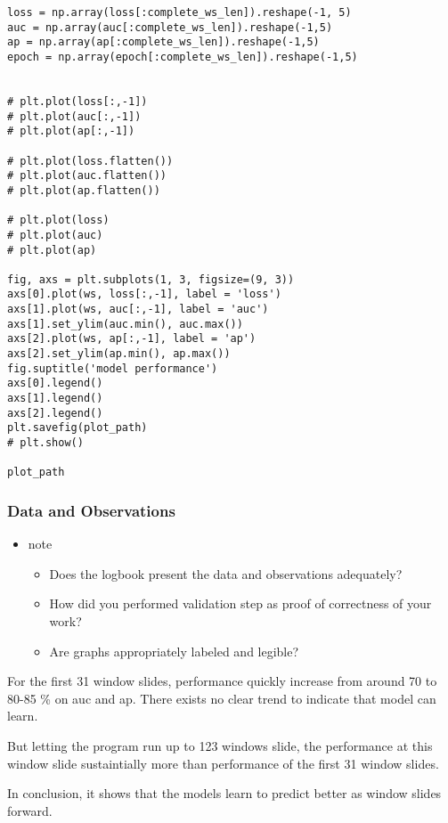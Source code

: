 \documentclass[11pt]{article}
\begin{document}
\begin{verbatim}
loss = np.array(loss[:complete_ws_len]).reshape(-1, 5)
auc = np.array(auc[:complete_ws_len]).reshape(-1,5)
ap = np.array(ap[:complete_ws_len]).reshape(-1,5)
epoch = np.array(epoch[:complete_ws_len]).reshape(-1,5)


# plt.plot(loss[:,-1])
# plt.plot(auc[:,-1])
# plt.plot(ap[:,-1])

# plt.plot(loss.flatten())
# plt.plot(auc.flatten())
# plt.plot(ap.flatten())

# plt.plot(loss)
# plt.plot(auc)
# plt.plot(ap)

fig, axs = plt.subplots(1, 3, figsize=(9, 3))
axs[0].plot(ws, loss[:,-1], label = 'loss')
axs[1].plot(ws, auc[:,-1], label = 'auc')
axs[1].set_ylim(auc.min(), auc.max())
axs[2].plot(ws, ap[:,-1], label = 'ap')
axs[2].set_ylim(ap.min(), ap.max())
fig.suptitle('model performance')
axs[0].legend()
axs[1].legend()
axs[2].legend()
plt.savefig(plot_path)
# plt.show()

plot_path
\end{verbatim}

\subsubsection{Data and Observations}
\label{sec:org84b6242}
\begin{itemize}
\item note
\begin{itemize}
\item Does the logbook present the data and observations adequately?
\item How did you performed validation step as proof of correctness of your work?
\item Are graphs appropriately labeled and legible?
\end{itemize}
\end{itemize}

For the first 31 window slides, performance quickly increase from around 70 to 80-85 \% on auc and ap. There exists no clear trend to indicate that model can learn.

But letting the program run up to 123 windows slide, the performance at this window slide sustaintially more than performance of the first 31 window slides.

In conclusion, it shows that the models learn to predict better as window slides forward.
\end{document}
